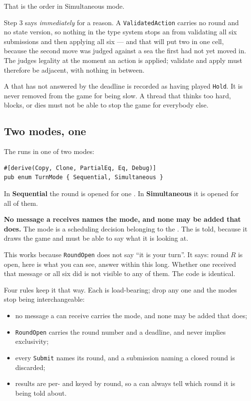 \documentclass{article}
\begin{document}
That is the order in Simultaneous mode.

Step 3 says \emph{immediately} for a reason. A \texttt{ValidatedAction} carries no round and no
state version, so nothing in the type system stops an \admiralty{} from validating all six
submissions and then applying all six --- and that \admiralty{} will put two \ships{} in one cell,
because the second move was judged against a sea the first had not yet moved in. The \MD{} judges
legality at the moment an action is applied; validate and apply must therefore be adjacent, with
nothing in between.

A \ship{} that has not answered by the deadline is recorded as having played \texttt{Hold}. It is
never removed from the game for being slow. A thread that thinks too hard, blocks, or dies must not
be able to stop the game for everybody else.

\subsection{Two modes, one \ship}
\label{proto:modes}

The \admiralty{} runs in one of two modes:

\begin{lstlisting}
#[derive(Copy, Clone, PartialEq, Eq, Debug)]
pub enum TurnMode { Sequential, Simultaneous }
\end{lstlisting}

In \textbf{Sequential} the round is opened for one \ship. In \textbf{Simultaneous} it is opened
for all of them.

\textbf{No message a \ship{} receives names the mode, and none may be added that does.} The mode is
a scheduling decision belonging to the \admiralty. The
\cartographer{} is told, because it draws the game and must be able to say what it is looking at.

This works because \texttt{RoundOpen} does not say ``it is your turn''. It says: round $R$ is open,
here is what you can see, answer within this long. Whether one \ship{} received that message or
all six did is not visible to any of them. The \ship{} code is identical.

Four rules keep it that way. Each is load-bearing; drop any one and the modes stop being
interchangeable:

\begin{itemize}
    \item no message a \ship{} can receive carries the mode, and none may be added that does;
    \item \texttt{RoundOpen} carries the round number and a deadline, and never implies
      exclusivity;
    \item every \texttt{Submit} names its round, and a submission naming a closed round is
      discarded;
    \item results are per-\ship{} and keyed by round, so a \ship{} can always tell which round it is
      being told about.
\end{itemize}
\end{document}
